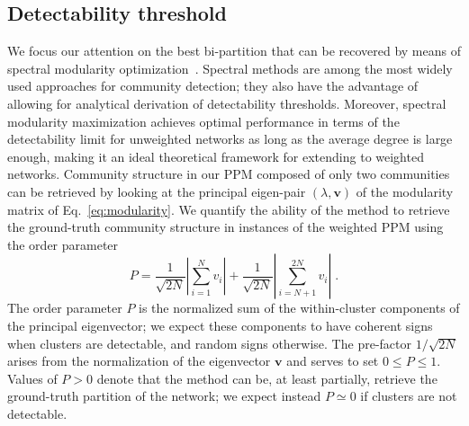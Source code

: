 \documentclass[a4paper,pre,superscriptaddress,floatfix,nofootinbib,twocolumn]{revtex4-1}
\begin{document}
\subsection*{Detectability threshold}

We focus our attention on the best bi-partition that can be recovered by means of spectral modularity optimization~\cite{newman2006modularity}. Spectral methods are among the most widely used approaches for community detection; they also have the advantage of allowing for analytical derivation of detectability thresholds. Moreover, spectral modularity maximization achieves optimal performance in terms of the detectability limit for unweighted networks as long as the average degree is large enough, making it an ideal theoretical framework for extending to weighted networks. Community structure in our PPM composed of only two communities can be retrieved by looking at the principal eigen-pair $(\lambda, \mathbf{v})$ of the modularity matrix of Eq.~\eqref{eq:modularity}. We quantify the ability of the method to retrieve the ground-truth community structure in instances of the weighted PPM using the order parameter
\begin{equation}
P = \frac{1}{\sqrt{2N}}  \left|\sum_{i=1}^{N} v_i \right|  + \frac{1}{\sqrt{2N}}  \left|\sum_{i=N+1}^{2N} v_i \right|   \; .
    \label{eq:order}
\end{equation}
The order parameter $P$ is the normalized sum of the within-cluster components of the principal eigenvector; we expect these components to have coherent signs when clusters are detectable, and random signs otherwise. The pre-factor $1/\sqrt{2N}$ arises from the normalization of the eigenvector $\mathbf{v}$ and serves to set $0 \leq P \leq 1$. Values of $P > 0$ denote that the method can be, at least partially, retrieve the ground-truth partition of the network; we expect instead $P \simeq 0$ if clusters are not detectable.
\end{document}
